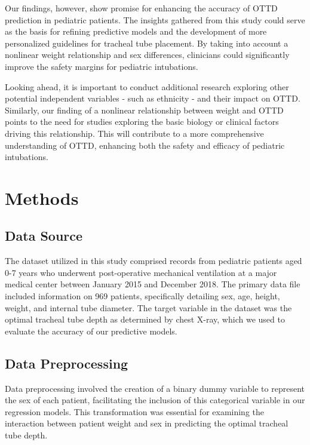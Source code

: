 \documentclass[11pt]{article}
\begin{document}
Our findings, however, show promise for enhancing the accuracy of OTTD prediction in pediatric patients. The insights gathered from this study could serve as the basis for refining predictive models and the development of more personalized guidelines for tracheal tube placement. By taking into account a nonlinear weight relationship and sex differences, clinicians could significantly improve the safety margins for pediatric intubations.

Looking ahead, it is important to conduct additional research exploring other potential independent variables - such as ethnicity - and their impact on OTTD. Similarly, our finding of a nonlinear relationship between weight and OTTD points to the need for studies exploring the basic biology or clinical factors driving this relationship. This will contribute to a more comprehensive understanding of OTTD, enhancing both the safety and efficacy of pediatric intubations.

\section*{Methods}

\subsection*{Data Source}
The dataset utilized in this study comprised records from pediatric patients aged 0-7 years who underwent post-operative mechanical ventilation at a major medical center between January 2015 and December 2018. The primary data file included information on 969 patients, specifically detailing sex, age, height, weight, and internal tube diameter. The target variable in the dataset was the optimal tracheal tube depth as determined by chest X-ray, which we used to evaluate the accuracy of our predictive models.

\subsection*{Data Preprocessing}
Data preprocessing involved the creation of a binary dummy variable to represent the sex of each patient, facilitating the inclusion of this categorical variable in our regression models. This transformation was essential for examining the interaction between patient weight and sex in predicting the optimal tracheal tube depth.
\end{document}
